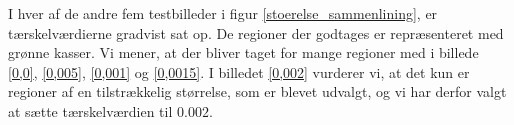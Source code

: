 {I hver af de andre fem testbilleder i figur \ref{stoerelse_sammenlining}, er
tærskelværdierne gradvist sat op. De regioner der godtages er repræsenteret med grønne kasser. 
Vi mener, at der bliver taget for mange regioner med i billede \ref{0,0}, \ref{0,005}, \ref{0,001} og
\ref{0,0015}. I billedet \ref{0,002} vurderer vi, at det kun er regioner
af en tilstrækkelig størrelse, som er blevet udvalgt, og vi har derfor
valgt at sætte tærskelværdien til $0.002$.

\begin{figure}[!h]
    \setlength\fboxsep{0pt}
    \setlength\fboxrule{0.5pt}
    \centering
    \\
\end{figure}}
